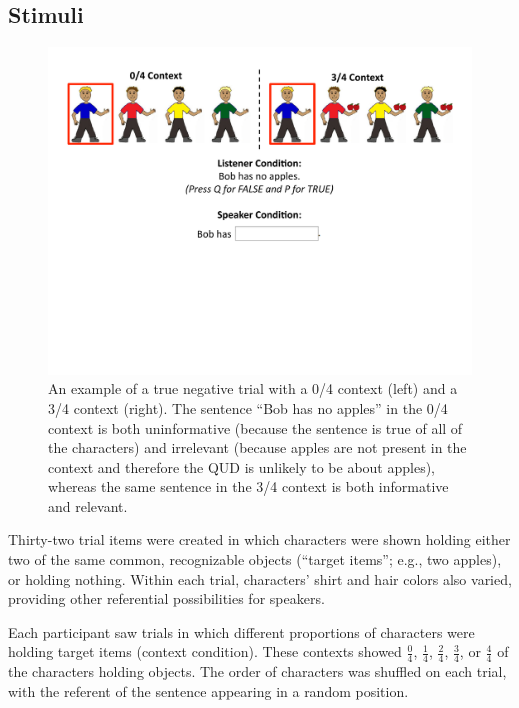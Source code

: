 \documentclass[man, floatsintext, noapacite]{apa6}
\begin{document}
\subsection{Stimuli}

\begin{figure}[t]
\begin{center} 
\includegraphics[width=6in]{figures/trialfig.pdf}
\caption{\label{fig:trial} An example of a true negative trial with a 0/4 context (left) and a 3/4 context (right).  The sentence ``Bob has no apples'' in the 0/4 context is both uninformative (because the sentence is true of all of the characters) and irrelevant (because apples are not present in the context and therefore the QUD is unlikely to be about apples), whereas the same sentence in the 3/4 context is both informative and relevant. }
\vspace{-5mm}
\end{center} 
\end{figure}

Thirty-two trial items were created in which characters were shown holding either two of the same common, recognizable objects (``target items''; e.g., two apples), or holding nothing. Within each trial, characters' shirt and hair colors also varied, providing other referential possibilities for speakers. 

Each participant saw trials in which different proportions of characters were holding target items (context condition).  These contexts showed $\frac{0}{4}$, $\frac{1}{4}$, $\frac{2}{4}$, $\frac{3}{4}$, or $\frac{4}{4}$ of the characters holding objects. The order of characters was shuffled on each trial, with the referent of the sentence appearing in a random position. 
\end{document}
